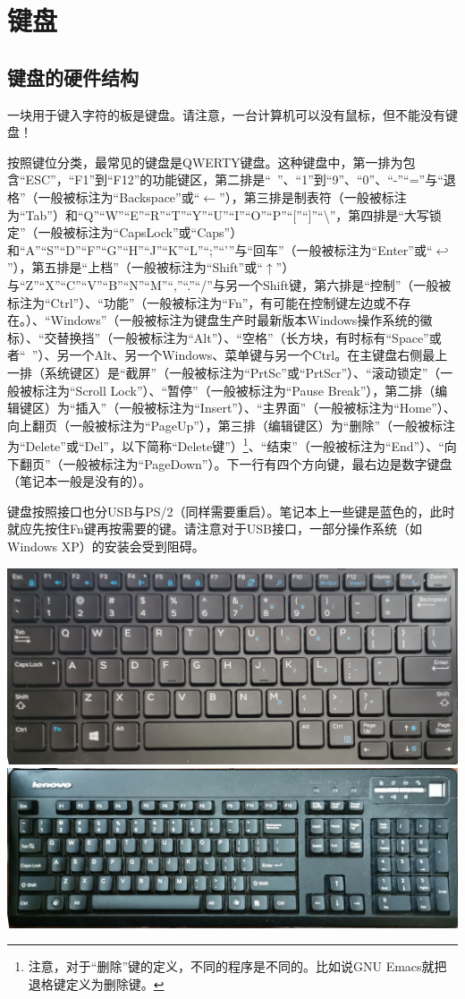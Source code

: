 \section{键盘}
\subsection{键盘的硬件结构}
一块用于键入字符的板是键盘。请注意，一台计算机可以没有鼠标，但不能没有键盘！\par
按照键位分类，最常见的键盘是QWERTY键盘。这种键盘中，第一排为包含“ESC”，“F1”到“F12”的功能键区，第二排是“~”、“1”到“9”、“0”、“-”“=”与“退格”（一般被标注为“Backspace”或“$\leftarrow$”），第三排是制表符（一般被标注为“Tab”）和“Q”“W”“E”“R”“T”“Y”“U”“I”“O”“P”“[”“]”“\textbackslash”，第四排是“大写锁定”（一般被标注为“CapsLock”或“Caps”）和“A”“S”“D”“F”“G”“H”“J”“K”“L”“;”“'”与“回车”（一般被标注为“Enter”或“$\hookleftarrow$”），第五排是“上档”（一般被标注为“Shift”或“$\uparrow$”）与“Z”“X”“C”“V”“B”“N”“M”“,”“.”“/”与另一个Shift键，第六排是“控制”（一般被标注为“Ctrl”）、“功能”（一般被标注为“Fn”，有可能在控制键左边或不存在。）、“Windows”（一般被标注为键盘生产时最新版本Windows操作系统的徽标）、“交替换挡”（一般被标注为“Alt”）、“空格”（长方块，有时标有“Space”或者“\verb*| |”）、另一个Alt、另一个Windows、菜单键与另一个Ctrl。在主键盘右侧最上一排（系统键区）是“截屏”（一般被标注为“PrtSc”或“PrtScr”）、“滚动锁定”（一般被标注为“Scroll Lock”）、“暂停”（一般被标注为“Pause Break”），第二排（编辑键区）为“插入”（一般被标注为“Insert”）、“主界面”（一般被标注为“Home”）、向上翻页（一般被标注为“PageUp”），第三排（编辑键区）为“删除”（一般被标注为“Delete”或“Del”，以下简称“Delete键”）\footnote{注意，对于“删除”键的定义，不同的程序是不同的。比如说GNU Emacs就把退格键定义为删除键。}、“结束”（一般被标注为“End”）、“向下翻页”（一般被标注为“PageDown”）。下一行有四个方向键，最右边是数字键盘（笔记本一般是没有的）。\par
键盘按照接口也分USB与PS/2（同样需要重启）。笔记本上一些键是蓝色的，此时就应先按住Fn键再按需要的键。请注意对于USB接口，一部分操作系统（如Windows XP）的安装会受到阻碍。
\begin{center}
	\includegraphics[scale=0.06]{pic/KB1}\\\includegraphics[scale=0.06]{pic/KB2}
\end{center}\par
